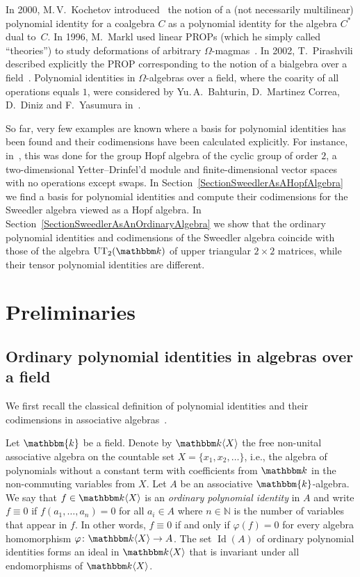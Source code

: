 \documentclass[12pt, reqno, a4paper]{amsart}
\theoremstyle{plain}
\theoremstyle{remark}
\theoremstyle{definition}
\numberwithin{equation}{section}
\DeclareMathOperator{\Id}{Id}
\begin{document}
   In 2000, M.\,V.~Kochetov introduced~\cite{KochetovCoalgId} the notion of a (not necessarily multilinear) polynomial identity for a coalgebra $C$ as a polynomial identity for the algebra $C^*$ dual to~$C$. 
In 1996, M.~Markl used linear PROPs (which he simply called ``theories'') to study deformations of arbitrary $\Omega$-magmas~\cite{MarklPROPDef}. In 2002, T.~Pirashvili described explicitly the PROP corresponding to the notion of a bialgebra over a field~\cite{PirashviliPROPBialgebra}.
Polynomial identities in $\Omega$-algebras over a field, where the coarity of all operations equals $1$, were considered by Yu.\,A.~Bahturin, D.~Martinez Correa, D.~Diniz
and F.~Yasumura in~\cite{BahtYas1,BahtYas2,BahtMCDYas}. 


So far, very few examples are known where a basis for polynomial identities has been found and their codimensions have been calculated explicitly. For instance, in~\cite{ASGordienko23}, this was done for the group Hopf algebra of the cyclic group of order $2$, a two-dimensional Yetter--Drinfel'd module and finite-dimensional vector spaces with no operations except swaps.
In Section~\ref{SectionSweedlerAsAHopfAlgebra} we find a basis for polynomial identities and compute their codimensions for the Sweedler algebra viewed as a Hopf algebra.  In Section~\ref{SectionSweedlerAsAnOrdinaryAlgebra}
we show that the ordinary polynomial identities and codimensions of the Sweedler algebra coincide with those
of the algebra $\mathrm{UT}_2(\mathbbm k)$ of upper triangular $2\times 2$ matrices,
while their tensor polynomial identities are different.

\section{Preliminaries}

\subsection{Ordinary polynomial identities in algebras over a field}\label{SubsectionOrdinaryPI}
We first recall the classical definition of polynomial identities and their codimensions in associative algebras~\cite{DrenKurs,GiaZai}.

Let $\mathbbm{k}$ be a field. Denote by $\mathbbm k \langle X \rangle$ the free non-unital associative algebra on
the countable set $X=\lbrace x_1, x_2, \ldots \rbrace$, i.e., the algebra of polynomials without a constant term with coefficients from $\mathbbm k$ in the non-commuting variables from $X$. Let $A$ be an associative $\mathbbm{k}$-algebra.
We say that $f\in \mathbbm k \langle X \rangle$ is an \textit{ordinary polynomial identity} in $A$ and write $f\equiv 0$
if $f(a_1, \ldots, a_n)=0$ for all $a_i \in A$ where $n\in\mathbb N$ is the number of variables that appear in $f$.
In other words, $f\equiv 0$ if and only if $\varphi(f)=0$ for every algebra homomorphism $\varphi \colon \mathbbm k \langle X \rangle \to A$. The set $\Id(A)$ of ordinary polynomial identities forms an ideal in $\mathbbm k \langle X \rangle$ that is invariant under all endomorphisms of $\mathbbm k \langle X \rangle$.
\end{document}
